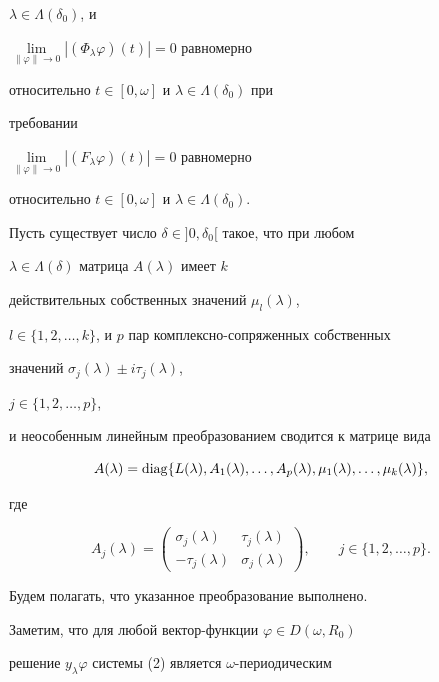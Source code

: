 $\lambda\in\Lambda(\delta_0)$, и 


$\lim\limits_{\|\varphi\|\to0}|(\Phi_\lambda\varphi)(t)|=0$ равномерно 


относительно $t\in[0,\omega]$ и $\lambda\in\Lambda(\delta_0)$ при 


требовании 


$\lim\limits_{\|\varphi\|\to0}|(F_\lambda\varphi)(t)|=0$ равномерно 


относительно $t\in[0,\omega]$ и $\lambda\in\Lambda(\delta_0)$. 


 


Пусть существует число $\delta\in]0,\delta_0[$ такое, что при любом 


$\lambda\in\Lambda(\delta)$ матрица $A(\lambda)$ имеет $k$ 


действительных собственных значений $\mu_l(\lambda)$, 


$l\in\{1,2,\dotsc,k\}$, и $p$ пар комплексно-сопряженных собственных 


значений $\sigma_j(\lambda)\pm i\tau_j(\lambda)$,


$j\in\{1,2,\dotsc,p\}$,


и неособенным линейным преобразованием сводится к матрице вида 


$$ 


A(\lambda)=\diag\{L(\lambda),A_1(\lambda),\dotsc,A_p(\lambda), 


\mu_1(\lambda),\dotsc,\mu_k(\lambda)\}, 


$$ 


где 


$$ 


A_j(\lambda)= 


\begin{pmatrix} 


\sigma_j(\lambda) &\tau_j(\lambda) \\ 


-\tau_j(\lambda) & \sigma_j(\lambda) 


\end{pmatrix} 


,\qquad j\in\{1,2,\dotsc,p\}. 


$$ 


Будем полагать, что указанное преобразование выполнено. 


 


Заметим, что для любой вектор-функции $\varphi\in D(\omega,R_0)$ 


решение $y_\lambda\varphi$ системы (2) является $\omega$-периодическим 


